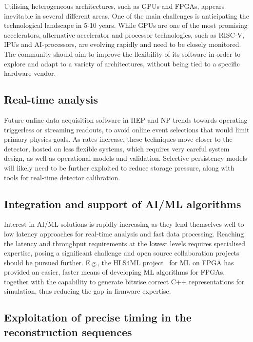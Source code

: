 \documentclass[10pt,a4paper]{article}
\begin{document}
Utilising heterogeneous architectures, such as GPUs and FPGAs, appears
inevitable in several different areas. One of the main challenges is
anticipating the technological landscape in 5-10 years. While GPUs are one of
the most promising accelerators, alternative accelerator and processor
technologies, such as RISC-V, IPUs and AI-processors, are evolving rapidly and
need to be closely monitored. The community should aim to improve the
flexibility of its software in order to explore and adapt to a variety of
architectures, without being tied to a specific hardware vendor.

\subsection{Real-time analysis}\label{real-time-analysis}

Future online data acquisition software in HEP and NP trends towards operating
triggerless or streaming readouts, to avoid online event selections that would
limit primary physics goals. As rates increase, these techniques move closer
to the detector, hosted on less flexible systems, which requires very careful
system design, as well as operational models and validation. Selective
persistency models will likely need to be further exploited to reduce storage
pressure, along with tools for real-time detector calibration.

\subsection{Integration and support of AI/ML
algorithms}\label{integration-and-support-of-aiml-algorithms}

Interest in AI/ML solutions is rapidly increasing as they lend themselves well
to low latency approaches for real-time analysis and fast data processing.
Reaching the latency and throughput requirements at the lowest levels requires
specialised expertise, posing a significant challenge and open source
collaboration projects should be pursued further. E.g., the HLS4ML
project~\cite{fastml_hls4ml,Duarte:2018ite} for ML on FPGA has provided an
easier, faster means of developing ML algorithms for FPGAs, together with the
capability to generate bitwise correct C++ representations for simulation,
thus reducing the gap in firmware expertise.

\subsection{Exploitation of precise timing in the reconstruction
sequences}\label{exploitation-of-precise-timing-in-the-reconstruction-sequences}
\end{document}
